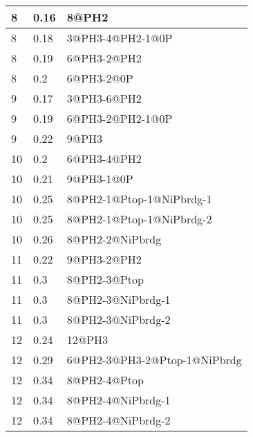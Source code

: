 \begin{center}
\begin{longtable}{|l|l|l|}
8 & 0.16 & 8@PH2 \\ \hline
8 & 0.18 & 3@PH3-4@PH2-1@0P \\ \hline
8 & 0.19 & 6@PH3-2@PH2 \\ \hline
8 & 0.2 & 6@PH3-2@0P \\ \hline
9 & 0.17 & 3@PH3-6@PH2 \\ \hline
9 & 0.19 & 6@PH3-2@PH2-1@0P \\ \hline
9 & 0.22 & 9@PH3 \\ \hline
10 & 0.2 & 6@PH3-4@PH2 \\ \hline
10 & 0.21 & 9@PH3-1@0P \\ \hline
10 & 0.25 & 8@PH2-1@Ptop-1@NiPbrdg-1 \\ \hline
10 & 0.25 & 8@PH2-1@Ptop-1@NiPbrdg-2 \\ \hline
10 & 0.26 & 8@PH2-2@NiPbrdg \\ \hline
11 & 0.22 & 9@PH3-2@PH2 \\ \hline
11 & 0.3 & 8@PH2-3@Ptop \\ \hline
11 & 0.3 & 8@PH2-3@NiPbrdg-1 \\ \hline
11 & 0.3 & 8@PH2-3@NiPbrdg-2 \\ \hline
12 & 0.24 & 12@PH3 \\ \hline
12 & 0.29 & 6@PH2-3@PH3-2@Ptop-1@NiPbrdg \\ \hline
12 & 0.34 & 8@PH2-4@Ptop \\ \hline
12 & 0.34 & 8@PH2-4@NiPbrdg-1 \\ \hline
12 & 0.34 & 8@PH2-4@NiPbrdg-2 \\ \hline

\end{longtable}
\end{center}
